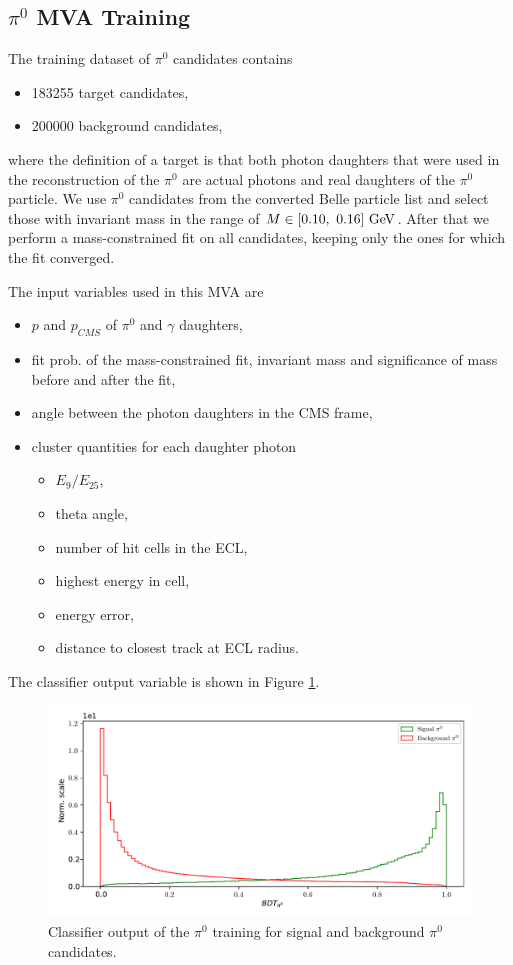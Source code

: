 \subsection{$\pi^0$ MVA Training}

The training dataset of $\pi^0$ candidates contains
\begin{itemize}
	\item 183255 target candidates,
	\item 200000 background candidates,
\end{itemize}
where the definition of a target is that both photon daughters that were used in the reconstruction of the $\pi^0$ are actual photons and real daughters of the $\pi^0$ particle. We use $\pi^0$ candidates from the converted Belle particle list and select those with invariant mass in the range of $M \in [0.10,~0.16]\mathrm{~GeV}$. After that we perform a mass-constrained fit on all candidates, keeping only the ones for which the fit converged. 

The input variables used in this MVA are
\begin{itemize}
	\item $p$ and $p_{CMS}$ of $\pi^0$ and $\gamma$ daughters,
	\item fit prob. of the mass-constrained fit, invariant mass and significance of mass before and after the fit,
	\item angle between the photon daughters in the CMS frame,
	\item cluster quantities for each daughter photon
	\begin{itemize}
		\item $E_9/E_{25}$,
		\item theta angle,
		\item number of hit cells in the ECL,
		\item highest energy in cell,
		\item energy error,
		\item distance to closest track at ECL radius.
	\end{itemize}
\end{itemize}

The classifier output variable is shown in Figure \ref{fig:ROE_pi0}.

\begin{figure}[!htb]
	\centering
	\captionsetup{width=0.8\linewidth}
	\includegraphics[width=\linewidth]{fig/ROECleanup_pi0}
	\caption{Classifier output of the $\pi^0$ training for signal and background $\pi^0$ candidates.}
	\label{fig:ROE_pi0}
\end{figure}

